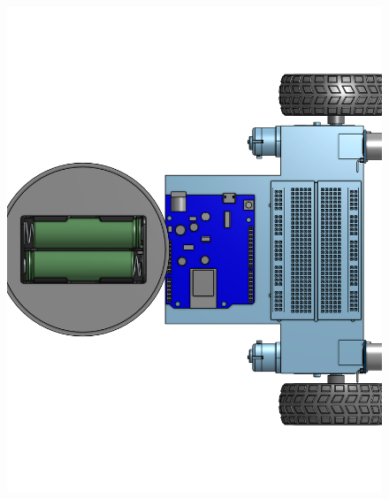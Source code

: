 \documentclass[a4paper,12pt]{article}
\begin{document}
\begin{center}\begin{figure}[H]\centering\includegraphics[height=0.45\textheight]{./model_images/a5.png}\end{figure}\FloatBarrier\end{center}
\end{document}
